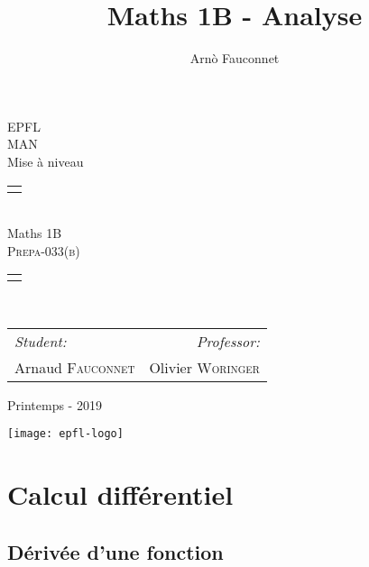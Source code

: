 \documentclass[
    11pt,
    a4paper,
    oneside,
    headinlcude, footinclude,
    twoside,
]{report}
\title{Maths 1B - Analyse}
\author{Arnò Fauconnet}
\begin{document}
\begin{titlepage}
   \begin{center}
       \vspace*{\fill}

       {\Huge EPFL}\\ 
       \vfill
       {\huge MAN}\\ [1em]
       {\Large Mise à niveau}\\
        \vfill
        \begin{tabularx}{\textwidth}{X}
            \Xhline{3\arrayrulewidth}\\
        \end{tabularx}\\ [2em]
        {\Huge Maths 1B} \\ [1em]
        \textsc{\huge Prepa-033(b)} \\ [2em]
        \begin{tabularx}{\textwidth}{X}
            \Xhline{3\arrayrulewidth}\\
        \end{tabularx}\\ [2em]
        \vspace{.7cm}
        {\large
        \begin{tabularx}{.9\textwidth}{Xr}
            \textit{Student:} & \textit{Professor:}\\
            Arnaud \textsc{Fauconnet} & Olivier \textsc{Woringer}
        \end{tabularx}}
        \vfill
        {\Large Printemps - 2019}

        \vfill
        \texttt{[image: epfl-logo]}

       \vfill
   \end{center} 
\end{titlepage} 
\setcounter{chapter}{2}
\chapter{Calcul différentiel}
\label{cha:calcul_differentiel}

\section{Dérivée d'une fonction}
\label{sec:derivee_d_une_fonction}
\end{document}
